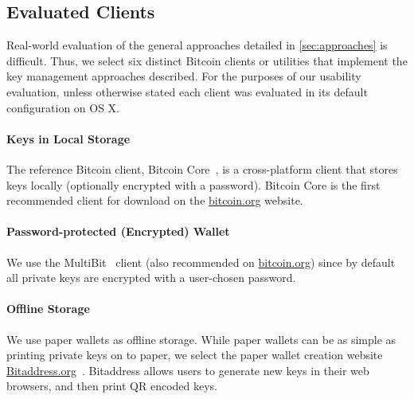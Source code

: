 
\subsection{Evaluated Clients}
Real-world evaluation of the general approaches detailed in \autoref{sec:approaches} is difficult. Thus, we select six distinct Bitcoin clients or utilities that implement the key management approaches described. For the purposes of our usability evaluation, unless otherwise stated each client was evaluated in its default configuration on OS X. 

\paragraph{Keys in Local Storage} The reference Bitcoin client, Bitcoin Core~\cite{bitcoinqt}, is a cross-platform client that stores keys locally (optionally encrypted with a password). Bitcoin Core is the first recommended client for download on the \url{bitcoin.org} website. 

\paragraph{Password-protected (Encrypted) Wallet} We use the MultiBit~\cite{multibit} client (also recommended on \url{bitcoin.org}) since by default all private keys are encrypted with a user-chosen password. 

\paragraph{Offline Storage} We use paper wallets as offline storage. While paper wallets can be as simple as printing private keys on to paper, we select the paper wallet creation website \url{Bitaddress.org}~\cite{bitaddress}. Bitaddress allows users to generate new keys in their web browsers, and then print QR encoded keys. 


